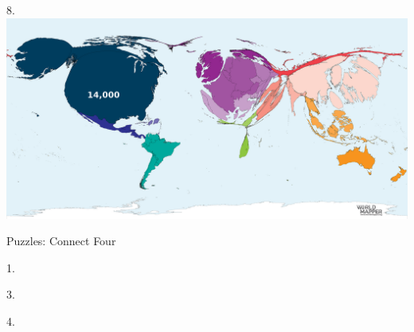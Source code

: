 \begin{frame}
\begin{center}
\Large
8. 
\\
\vspace{0.5em}\includegraphics[height=0.6\paperheight]{maps/picture_8.png}
\\
\end{center}
\end{frame}
\begin{frame}
\begin{center}
\Huge
Puzzles: Connect Four
\end{center}
\end{frame}
\begin{frame}
\begin{center}
\Large
1. 
\end{center}
\end{frame}
\begin{frame}

\end{frame}
\begin{frame}
\begin{center}
\Large
3. 
\end{center}
\end{frame}
\begin{frame}
\begin{center}
\Large
4. 
\end{center}
\end{frame}
